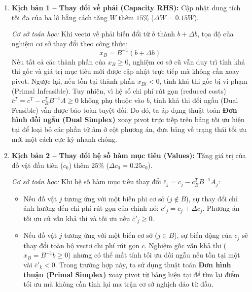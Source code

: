 \documentclass[fontsize=13pt,a4paper]{report}
\begin{document}
\begin{enumerate}[leftmargin=*]
    \item \textbf{Kịch bản 1 -- Thay đổi vế phải (Capacity RHS):}
    Cập nhật dung tích tối đa của ba lô bằng cách tăng $W$ thêm $15\%$ ($\Delta W = 0.15 W$). 
    
    \textit{Cơ sở toán học:} Khi vectơ vế phải biến đổi từ $b$ thành $b + \Delta b$, tọa độ của nghiệm cơ sở thay đổi theo công thức:
    \begin{equation}
        x_B = B^{-1}(b + \Delta b)
    \end{equation}
    Nếu tất cả các thành phần của $x_B \ge 0$, nghiệm cơ sở cũ vẫn duy trì tính khả thi gốc và giá trị mục tiêu mới được cập nhật trực tiếp mà không cần xoay pivot. Ngược lại, nếu tồn tại thành phần $x_{Bi} < 0$, tính khả thi gốc bị vi phạm (Primal Infeasible). Tuy nhiên, vì hệ số chi phí rút gọn (reduced costs) $\bar{c}^T = c^T - c_B^T B^{-1}A \ge 0$ không phụ thuộc vào $b$, tính khả thi đối ngẫu (Dual Feasible) vẫn được bảo toàn tuyệt đối. Do đó, ta áp dụng thuật toán \textbf{Đơn hình đối ngẫu (Dual Simplex)} xoay pivot trực tiếp trên bảng tối ưu hiện tại để loại bỏ các phần tử âm ở cột phương án, đưa bảng về trạng thái tối ưu mới một cách cực kỳ nhanh chóng.
    
    \item \textbf{Kịch bản 2 -- Thay đổi hệ số hàm mục tiêu (Values):}
    Tăng giá trị của đồ vật đầu tiên ($c_0$) thêm $25\%$ ($\Delta c_0 = 0.25 c_0$).
    
    \textit{Cơ sở toán học:} Khi hệ số hàm mục tiêu thay đổi $\bar{c}_j = c_j - c_B^T B^{-1}A_j$:
    \begin{itemize}
        \item Nếu đồ vật $j$ tương ứng với một biến phi cơ sở ($j \notin B$), sự thay đổi chỉ ảnh hưởng đến chi phí rút gọn của chính nó: $\bar{c}'_j = \bar{c}_j + \Delta c_j$. Phương án tối ưu cũ vẫn khả thi và tối ưu nếu $\bar{c}'_j \ge 0$.
        \item Nếu đồ vật $j$ tương ứng với một biến cơ sở ($j \in B$), sự biến động của $c_j$ sẽ thay đổi toàn bộ vectơ chi phí rút gọn $\bar{c}$. Nghiệm gốc vẫn khả thi ($x_B = B^{-1}b \ge 0$) nhưng có thể mất tính tối ưu đối ngẫu nếu tồn tại một vài $\bar{c}'_k < 0$. Trong trường hợp này, ta sử dụng thuật toán \textbf{Đơn hình thuận (Primal Simplex)} xoay pivot từ bảng hiện tại để tìm lại điểm tối ưu mà không cần tính lại ma trận cơ sở nghịch đảo từ đầu.
    \end{itemize}
    

\end{enumerate}
\end{document}
